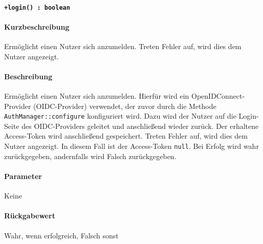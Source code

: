 \paragraph{\texttt{+login() : boolean}}%
\paragraph*{Kurzbeschreibung}
Ermöglicht einen Nutzer sich anzumelden.
Treten Fehler auf, wird dies dem Nutzer angezeigt.
\paragraph*{Beschreibung}
Ermöglicht einen Nutzer sich anzumelden.
Hierfür wird ein OpenIDConnect-Provider (OIDC-Provider) verwendet, der zuvor durch die Methode \verb#AuthManager::configure# konfiguriert wird.
Dazu wird der Nutzer auf die Login-Seite des OIDC-Providers geleitet und anschließend wieder zurück.
Der erhaltene Access-Token wird anschließend gespeichert.
Treten Fehler auf, wird dies dem Nutzer angezeigt. In diesem Fall ist der Access-Token \verb#null#.
Bei Erfolg wird wahr zurückgegeben, andernfalls wird Falsch zurückgegeben.
\paragraph*{Parameter}
Keine
\paragraph*{Rückgabewert}
Wahr, wenn erfolgreich, Falsch sonst
